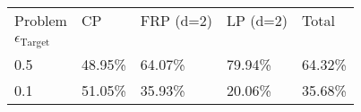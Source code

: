 \begin{tabular}{lllll}
Problem & CP & FRP (d=2) & LP (d=2) & Total \\
$\epsilon_{{\text{{Target}}}}$ &  &  &  &  \\
0.5 & 48.95\% & 64.07\% & 79.94\% & 64.32\% \\
\cline{1-5}
0.1 & 51.05\% & 35.93\% & 20.06\% & 35.68\% \\
\cline{1-5}
\end{tabular}
